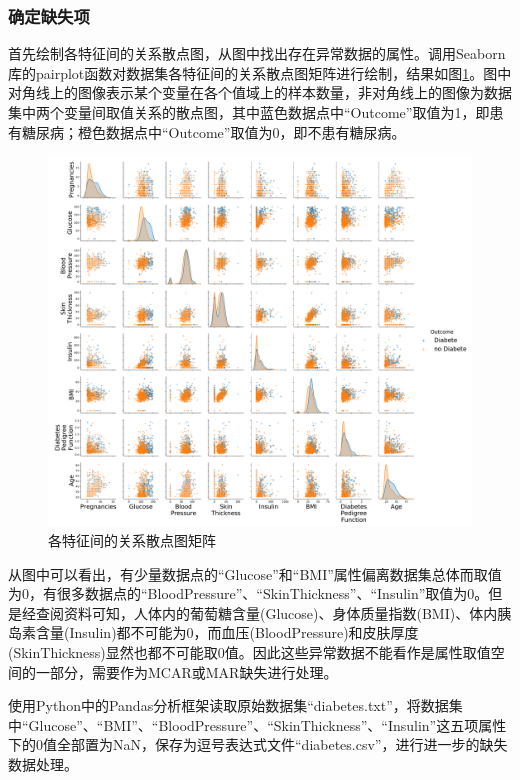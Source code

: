 \documentclass[a4paper]{ctexart}
\begin{document}
\subsubsection{确定缺失项}\label{sec:确定缺失项}
首先绘制各特征间的关系散点图，从图中找出存在异常数据的属性。调用Seaborn库的pairplot函数对数据集各特征间的关系散点图矩阵进行绘制，结果如图\ref{figure:交叉图}。图中对角线上的图像表示某个变量在各个值域上的样本数量，非对角线上的图像为数据集中两个变量间取值关系的散点图，其中蓝色数据点中“Outcome”取值为1，即患有糖尿病；橙色数据点中“Outcome”取值为0，即不患有糖尿病。
\begin{figure}[htbp]
	\centering
	\includegraphics[width=\textwidth]{figure/1.pdf}
	\caption{各特征间的关系散点图矩阵}
	\label{figure:交叉图}
\end{figure}
从图中可以看出，有少量数据点的“Glucose”和“BMI”属性偏离数据集总体而取值为0，有很多数据点的“BloodPressure”、“SkinThickness”、“Insulin”取值为0。但是经查阅资料\cite{bmi}\cite{ins}可知，人体内的葡萄糖含量(Glucose)、身体质量指数(BMI)、体内胰岛素含量(Insulin)都不可能为0，而血压(BloodPressure)和皮肤厚度(SkinThickness)显然也都不可能取0值。因此这些异常数据不能看作是属性取值空间的一部分，需要作为MCAR或MAR缺失进行处理。

使用Python中的Pandas分析框架读取原始数据集“diabetes.txt”，将数据集中“Glucose”、“BMI”、“BloodPressure”、“SkinThickness”、“Insulin”这五项属性下的0值全部置为NaN，保存为逗号表达式文件“diabetes.csv”，进行进一步的缺失数据处理。
\end{document}
